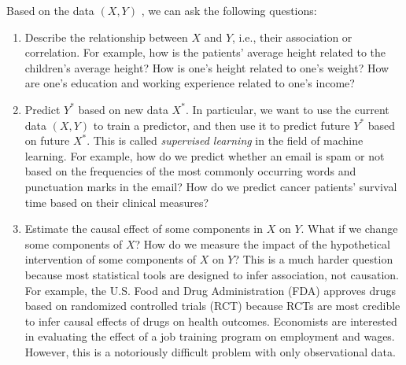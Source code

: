 Based on the data $(X,Y)$ , we can ask the following questions:
\begin{enumerate}[(Q1)]
\item Describe the relationship between $X$ and $Y$, i.e., their association
or correlation. For example, how is the patients' average height related
to the children's average height? How is one's height related to one's
weight? How are one's education and working experience related to one's income?

\item Predict $Y^{*}$ based on new data $X^{*}$. In particular,
we want to use the current data $(X,Y)$ to train a predictor, and
then use it to predict future $Y^*$ based on future $X^*$. This is called
{\it supervised learning} in the field of machine learning. For example,
how do we predict whether an email is spam or not based on the frequencies of the most commonly occurring words and punctuation marks in the email? How do we predict cancer patients' survival time based on their clinical measures?


\item Estimate the causal effect of some components in $X$ on $Y$. What if we change
some components of $X$? How do we measure the impact of the hypothetical
intervention of some components of $X$ on $Y$? This is a much harder
question because most statistical tools are designed to infer association, not causation. For example, the U.S. Food and Drug Administration (FDA) approves drugs based on randomized
controlled trials (RCT) because RCTs are most credible to infer causal
effects of drugs on health outcomes. Economists are interested in evaluating the effect of a
job training program on employment and wages. However, this is a notoriously difficult problem with only observational data. 
\end{enumerate}




